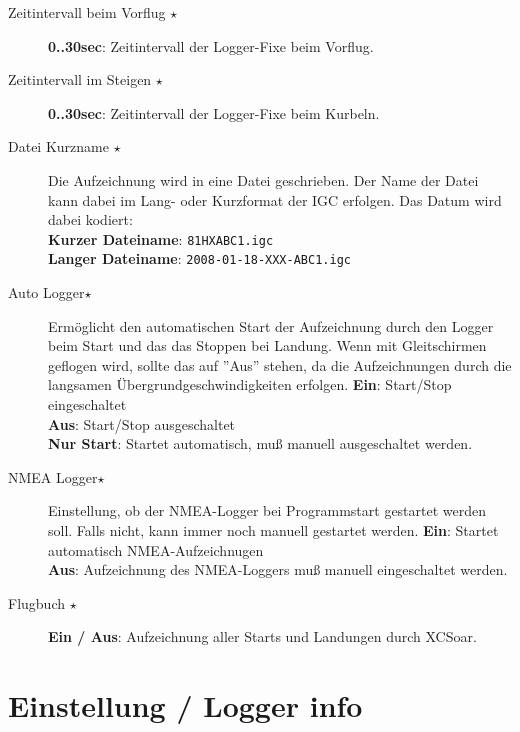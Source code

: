 \begin{description}
\item[Zeitintervall beim Vorflug $\star$] {\bf 0..30sec}: Zeitintervall der Logger-Fixe  beim Vorflug.
\item[Zeitintervall im Steigen $\star$]  {\bf 0..30sec}: Zeitintervall der Logger-Fixe  beim Kurbeln.
\item[Datei Kurzname $\star$] Die Aufzeichnung wird in eine Datei geschrieben. Der Name der Datei kann dabei im Lang- oder Kurzformat der IGC erfolgen. Das Datum wird dabei kodiert:\\
 {\bf Kurzer Dateiname}: \verb"81HXABC1.igc"\\
 {\bf Langer Dateiname}: \verb"2008-01-18-XXX-ABC1.igc"\\
\item[Auto Logger$\star$] Ermöglicht den automatischen Start  der Aufzeichnung durch den Logger beim Start und das das Stoppen bei Landung.
Wenn mit Gleitschirmen geflogen wird, sollte das auf ''Aus'' stehen, da  die Aufzeichnungen durch die langsamen Übergrundgeschwindigkeiten erfolgen.
   {\bf Ein}:  Start/Stop eingeschaltet\\
  {\bf Aus}: Start/Stop ausgeschaltet\\
  {\bf Nur Start}: Startet automatisch, muß manuell ausgeschaltet werden.
\item[NMEA Logger$\star$] Einstellung, ob der NMEA-Logger bei Programmstart gestartet werden soll. Falls nicht,
kann immer noch manuell gestartet werden.
  {\bf Ein}:  Startet automatisch NMEA-Aufzeichnugen\\
  {\bf Aus}: Aufzeichnung des NMEA-Loggers muß manuell eingeschaltet werden.\\
\item[Flugbuch $\star$]  {\bf Ein / Aus}: Aufzeichnung aller Starts und Landungen durch \textsf{XCSoar}.
\end{description}


\section{Einstellung / Logger info} \label{conf:logger_info}

